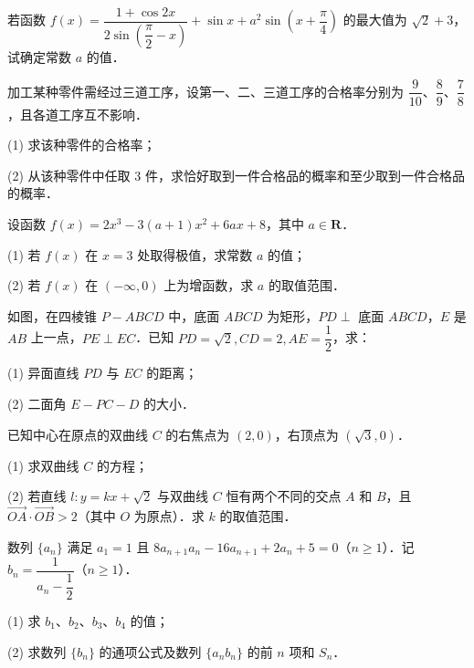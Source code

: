 \begin{question}
若函数 $f(x) = \dfrac{1 + \cos 2x}{2\sin\left(\dfrac{\pi}{2} - x\right)} + \sin x + a^2 \sin\left(x + \dfrac{\pi}{4}\right)$ 的最大值为 $\sqrt{2} + 3$，试确定常数 $a$ 的值．

\end{question}
\begin{question}
加工某种零件需经过三道工序，设第一、二、三道工序的合格率分别为 $\dfrac{9}{10}$、$\dfrac{8}{9}$、$\dfrac{7}{8}$，且各道工序互不影响．

(1) 求该种零件的合格率；

(2) 从该种零件中任取 3 件，求恰好取到一件合格品的概率和至少取到一件合格品的概率．

\end{question}
\begin{question}
设函数 $f(x) = 2x^3 - 3(a + 1)x^2 + 6ax + 8$，其中 $a \in \mathbf{R}$．

(1) 若 $f(x)$ 在 $x = 3$ 处取得极值，求常数 $a$ 的值；

(2) 若 $f(x)$ 在 $(-\infty, 0)$ 上为增函数，求 $a$ 的取值范围．

\Needspace{0.4\textheight}
\end{question}
\begin{question}
如图，在四棱锥 $P - ABCD$ 中，底面 $ABCD$ 为矩形，$PD \perp$ 底面 $ABCD$，$E$ 是 $AB$ 上一点，$PE \perp EC$．已知 $PD = \sqrt{2}, CD = 2, AE = \dfrac{1}{2}$，求：
\nopagebreak[4]
\begin{center}\end{center}
\nopagebreak[4]
(1) 异面直线 $PD$ 与 $EC$ 的距离；

(2) 二面角 $E - PC - D$ 的大小．

\end{question}
\begin{question}
已知中心在原点的双曲线 $C$ 的右焦点为 $(2, 0)$，右顶点为 $(\sqrt{3}, 0)$．

(1) 求双曲线 $C$ 的方程；

(2) 若直线 $l: y = kx + \sqrt{2}$ 与双曲线 $C$ 恒有两个不同的交点 $A$ 和 $B$，且 $\overrightarrow{OA} \cdot \overrightarrow{OB} > 2$（其中 $O$ 为原点）．求 $k$ 的取值范围．

\end{question}
\begin{question}
数列 $\{a_n\}$ 满足 $a_1 = 1$ 且 $8a_{n+1} a_n - 16a_{n+1} + 2a_n + 5 = 0$（$n \geqslant 1$）．记 $b_n = \dfrac{1}{a_n - \dfrac{1}{2}}$（$n \geqslant 1$）．

(1) 求 $b_1$、$b_2$、$b_3$、$b_4$ 的值；

(2) 求数列 $\{b_n\}$ 的通项公式及数列 $\{a_n b_n\}$ 的前 $n$ 项和 $S_n$．

\end{question}